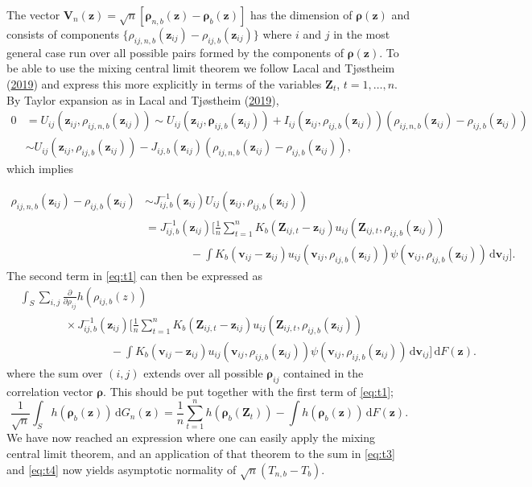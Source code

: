 \documentclass[
  12pt,
  letterpaper]{article}
\numberwithin{equation}{section}
\newcommand{\Z}{\bm{Z}}
\newcommand{\z}{\bm{z}}
\newcommand{\fv}{\bm{v}}
\newcommand{\fV}{\bm{V}}
\newcommand{\frho}{\bm{\rho}}
\newcommand{\di}{\,\textrm{d}}
\begin{document}
The vector \(\fV_n(\z) = \sqrt{n}[\frho_{n,b}(\z)-\frho_b(\z)]\) has the dimension of \(\frho(\z)\) and consists of components \(\{\rho_{ij,n,b}(\z_{ij})-\rho_{ij,b}(\z_{ij})\}\) where \(i\) and \(j\) in the most general case run over all possible pairs formed by the components of \(\frho(\z)\). To be able to use the mixing central limit theorem we follow Lacal and Tjøstheim (\protect\hyperlink{ref-lacal2018estimating}{2019}) and express this more explicitly in terms of the variables \(\Z_{t}\), \(t=1,\ldots,n\). By Taylor expansion as in Lacal and Tjøstheim (\protect\hyperlink{ref-lacal2018estimating}{2019}),
\begin{align*}
0 &= U_{ij}(\z_{ij},\rho_{ij,n,b}(\z_{ij})) \sim  U_{ij}(\z_{ij},\frho_{ij,b}(\z_{ij})) + I_{ij}(\z_{ij},\rho_{ij,b}(\z_{ij}))(\rho_{ij,n,b}(\z_{ij})-\rho_{ij,b}(\z_{ij})) \\
& \sim U_{ij}(\z_{ij},\rho_{ij,b}(\z_{ij})) - J_{ij,b}(\z_{ij})(\rho_{ij,n,b}(\z_{ij})-\rho_{ij,b}(\z_{ij})),
\end{align*}
which implies

\begin{align}
\rho_{ij,n,b}(\z_{ij}) - \rho_{ij,b}(\z_{ij}) & \sim J_{ij,b}^{-1}(\z_{ij})U_{ij}(\z_{ij},\rho_{ij,b}(\z_{ij})) \nonumber \\
& = J_{ij,b}^{-1}(\z_{ij})\Big[\frac{1}{n}\sum_{t=1}^{n} K_b(\Z_{ij,t} - \z_{ij})u_{ij}(\Z_{ij,t},\rho_{ij,b}(\z_{ij})) \nonumber \\
& \qquad\qquad - \int K_b(\fv_{ij} - \z_{ij})u_{ij}(\fv_{ij},\rho_{ij,b}(\z_{ij}))\psi(\fv_{ij}, \rho_{ij,b}(\z_{ij})) \di \fv_{ij}\Big].
\label{eq:t2}
\end{align}
The second term in \eqref{eq:t1} can then be expressed as
\begin{align}
& \int_S \sum_{i,j} \frac{\partial}{\partial \rho_{ij}} h(\rho_{ij,b}(z)) \nonumber \\
& \qquad\qquad \times J_{ij,b}^{-1}(\z_{ij}) \Big[\frac{1}{n}\sum_{t=1}^{n} K_b(\Z_{ij,t}-\z_{ij})u_{ij}(\Z_{ij,t},\rho_{ij,b}(\z_{ij})) \nonumber \\
& \qquad\qquad\qquad\qquad- \int K_b(\fv_{ij}-\z_{ij})u_{ij}(\fv_{ij},\rho_{ij,b}(\z_{ij}))\psi(\fv_{ij},\rho_{ij,b}(\z_{ij})) \di \fv_{ij}\Big] \di F(\z).
\label{eq:t3}
\end{align}
where the sum over \((i,j)\) extends over all possible \(\frho_{ij}\) contained in the correlation vector \(\frho\). This should be put together with the first term of \eqref{eq:t1};
\begin{equation}
\frac{1}{\sqrt{n}} \int_S h(\frho_b(\z)) \di G_n(\z) = \frac{1}{n}\sum_{t=1}^{n}h\left(\frho_b(\Z_{t})\right) - \int h\left(\frho_b(\z)\right) \di F(\z).
\label{eq:t4}
\end{equation}
We have now reached an expression where one can easily apply the mixing central limit theorem, and an application of that theorem to the sum in \eqref{eq:t3} and \eqref{eq:t4} now yields asymptotic normality of \(\sqrt{n}\left(T_{n,b}-T_{b}\right)\).
\end{document}
